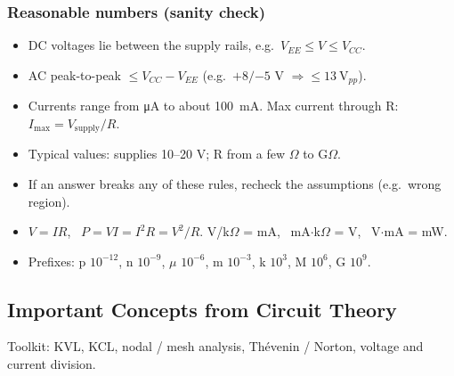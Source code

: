     \subsubsection{Reasonable numbers (sanity check)}
    \begin{itemize}
        \item DC voltages lie between the supply rails, e.g.\ $V_{EE} \le V \le V_{CC}$. 
        \item AC peak-to-peak $\le V_{CC} - V_{EE}$ (e.g.\ $+8/{-5}$ V $\Rightarrow \le \SI{13}{\volt_{pp}}$).
        \item Currents range from \si{\micro\ampere} to about \SI{100}{\milli\ampere}. Max current through R: $I_{\mathrm{max}} = V_{\mathrm{supply}}/R$.
        \item Typical values: supplies 10--20 V; R from a few $\Omega$ to G$\Omega$.
        \item If an answer breaks any of these rules, recheck the assumptions (e.g.\ wrong region).
    \end{itemize}

    \begin{handy}
        \begin{itemize}
            \item $V = IR$, \ $P = VI = I^2R = V^2/R$. \quad V/k$\Omega$ = mA, \ mA$\cdot$k$\Omega$ = V, \ V$\cdot$mA = mW.
            \item Prefixes: p $10^{-12}$, n $10^{-9}$, $\mu$ $10^{-6}$, m $10^{-3}$, k $10^{3}$, M $10^{6}$, G $10^{9}$.
        \end{itemize}
    \end{handy}

    \subsection[1.5]{Important Concepts from Circuit Theory}
    Toolkit: KVL, KCL, nodal / mesh analysis, Th\'evenin / Norton, voltage and current division.


